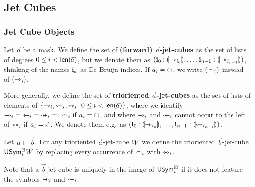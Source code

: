 \documentclass[a4paper]{article}
\begin{document}
\subsection{Jet Cubes}

\subsubsection{Jet Cube Objects}
\begin{definition} \label{def:jet-cube}
	Let $\vec a$ be a mask.
	We define the set of \textbf{(forward) $\vec{a}$-jet-cubes} as the set of lists of degrees $0 \leq i < \mathsf{len}(\vec a)$, but we denote them as
	$(\mathbf{i}_0 : {\llparenthesis \rightarrowtriangle_{i_0} \rrparenthesis}, \ldots, \mathbf{i}_{n-1} : {\llparenthesis \rightarrowtriangle_{i_{n-1}} \rrparenthesis})$, thinking of the names $\mathbf{i}_k$ as De Bruijn indices.
	If $a_i = \npolar$, we write ${\llparenthesis \frown_i \rrparenthesis}$ instead of ${\llparenthesis \rightarrowtriangle_i \rrparenthesis}$.
	
	
	More generally, we define the set of \textbf{trioriented $\vec a$-jet-cubes} as the set of lists of elements of \linebreak $\mathopen{}\left\{ \rightarrowtriangle_i, \leftarrowtriangle_i, \leftrightarrowtriangle_i \,\middle|\, 0 \leq i < \mathsf{len}(\vec a) \right\}\mathclose{}$, where we identify ${\rightarrowtriangle_i} = {\leftarrowtriangle_i} = {\leftrightarrowtriangle_i} =: {\frown_i}$ if $a_i = \npolar$, and where $\rightarrowtriangle_i$ and $\leftarrowtriangle_i$ cannot occur to the left of $\leftrightarrowtriangle_i$ if $a_i = \ypolar$.
	We denote them e.g.\ as $(\mathbf{i}_0 : {\llparenthesis \rightarrowtriangle_{i_0} \rrparenthesis}, \ldots, \mathbf{i}_{n-1} : {\llparenthesis \leftarrowtriangle_{i_{n-1}} \rrparenthesis})$.
\end{definition}
\begin{definition} \label{def:sym-forget-cube}
	Let $\vec a \sqsubset \vec b$. For any trioriented $\vec a$-jet-cube $W$, we define the trioriented $\vec b$-jet-cube $\mathsf{USym}^\boxdot_i W$ by replacing every occurrence of $\frown_i$ with $\leftrightarrowtriangle_i$.
\end{definition}
Note that a $\vec b$-jet-cube is uniquely in the image of $\mathsf{USym}^\boxdot_i$ if it does not feature the symbols $\rightarrowtriangle_i$ and $\leftarrowtriangle_i$.
\end{document}
